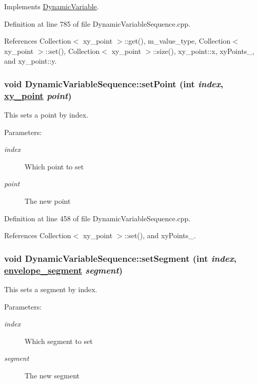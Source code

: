 Implements \hyperlink{classDynamicVariable_a4}{Dynamic\-Variable}.

Definition at line 785 of file Dynamic\-Variable\-Sequence.cpp.

References Collection$<$ xy\_\-point $>$::get(), m\_\-value\_\-type, Collection$<$ xy\_\-point $>$::set(), Collection$<$ xy\_\-point $>$::size(), xy\_\-point::x, xy\-Points\_\-, and xy\_\-point::y.\hypertarget{classDynamicVariableSequence_a14}{
\subsubsection[setPoint]{\setlength{\rightskip}{0pt plus 5cm}void Dynamic\-Variable\-Sequence::set\-Point (int {\em index}, \hyperlink{structxy__point}{xy\_\-point} {\em point})}}
\label{classDynamicVariableSequence_a14}


This sets a point by index. \begin{Desc}
\item[Parameters:]
\begin{description}
\item[{\em index}]Which point to set \item[{\em point}]The new point \end{description}
\end{Desc}


Definition at line 458 of file Dynamic\-Variable\-Sequence.cpp.

References Collection$<$ xy\_\-point $>$::set(), and xy\-Points\_\-.\hypertarget{classDynamicVariableSequence_a12}{
\subsubsection[setSegment]{\setlength{\rightskip}{0pt plus 5cm}void Dynamic\-Variable\-Sequence::set\-Segment (int {\em index}, \hyperlink{structenvelope__segment}{envelope\_\-segment} {\em segment})}}
\label{classDynamicVariableSequence_a12}


This sets a segment by index. \begin{Desc}
\item[Parameters:]
\begin{description}
\item[{\em index}]Which segment to set \item[{\em segment}]The new segment \end{description}
\end{Desc}



